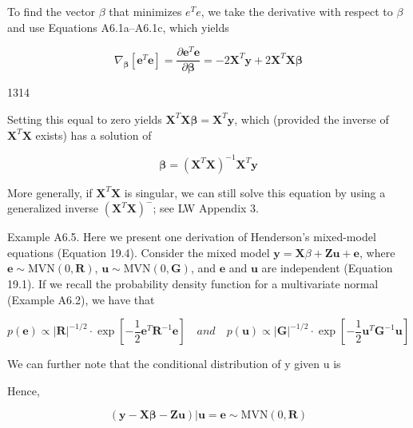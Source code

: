 \documentclass{article}
\begin{document}
To find the vector  $ \beta $ that minimizes  $ e^T e $, we take the derivative with respect to  $ \beta $ and use Equations A6.1a–A6.1c, which yields

\begin{equation}
\nabla_{\boldsymbol{\beta}}\left[\mathbf{e}^{T}\mathbf{e}\right]=\frac{\partial\mathbf{e}^{T}\mathbf{e}}{\partial\boldsymbol{\beta}}=-2\mathbf{X}^{T}\mathbf{y}+2\mathbf{X}^{T}\mathbf{X}\boldsymbol{\beta}
\end{equation}

1314

Setting this equal to zero yields  $ \mathbf{X}^T\mathbf{X}\boldsymbol{\beta} = \mathbf{X}^T\mathbf{y} $, which (provided the inverse of  $ \mathbf{X}^T\mathbf{X} $ exists) has a solution of

\begin{equation}
\boldsymbol{\beta}=\left(\mathbf{X}^{T}\mathbf{X}\right)^{-1}\mathbf{X}^{T}\mathbf{y}
\end{equation}

More generally, if  $ \mathbf{X}^T \mathbf{X} $ is singular, we can still solve this equation by using a generalized inverse  $ \left(\mathbf{X}^T \mathbf{X}\right)^{-} $; see LW Appendix 3.

Example A6.5. Here we present one derivation of Henderson's mixed-model equations (Equation 19.4). Consider the mixed model  $ \mathbf{y} = \mathbf{X}\beta + \mathbf{Z}\mathbf{u} + \mathbf{e} $, where  $ \mathbf{e} \sim \text{MVN}(0, \mathbf{R}) $,  $ \mathbf{u} \sim \text{MVN}(0, \mathbf{G}) $, and  $ \mathbf{e} $ and  $ \mathbf{u} $ are independent (Equation 19.1). If we recall the probability density function for a multivariate normal (Example A6.2), we have that

\begin{equation}
p(\mathbf{e})\propto|\mathbf{R}|^{-1/2}\cdot\exp\left[-\frac{1}{2}\mathbf{e}^{T}\mathbf{R}^{-1}\mathbf{e}\right]\quad and\quad p(\mathbf{u})\propto|\mathbf{G}|^{-1/2}\cdot\exp\left[-\frac{1}{2}\mathbf{u}^{T}\mathbf{G}^{-1}\mathbf{u}\right]
\end{equation}

We can further note that the conditional distribution of y given u is

Hence,

\begin{equation}
\left(\mathbf{y}-\mathbf{X}\boldsymbol{\beta}-\mathbf{Z}\mathbf{u}\right)\left|\mathbf{u}=\mathbf{e}\sim\mathrm{M V N}(0,\mathbf{R})\right.
\end{equation}
\end{document}
